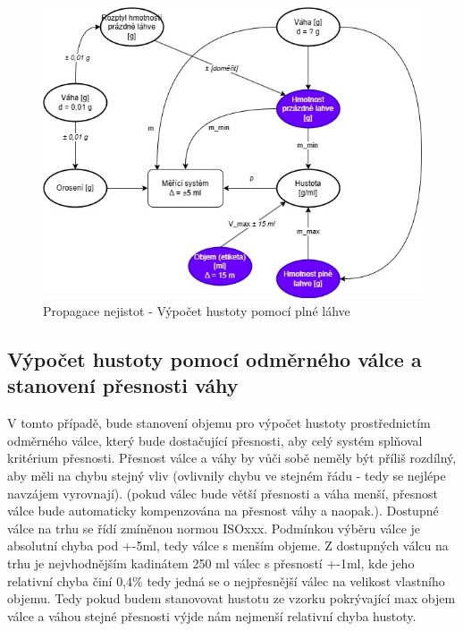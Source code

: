 \begin{figure}[H]
    \begin{center}
        \includegraphics[scale=0.6]{obrazky/Propagace nejistot-Metoda1+.jpg}
    \end{center}
    \caption{Propagace nejistot - Výpočet hustoty pomocí plné láhve}
\end{figure}

\subsection{Výpočet hustoty pomocí odměrného válce a stanovení přesnosti váhy}

V tomto případě, bude stanovení objemu pro výpočet hustoty prostřednictím odměrného válce, který bude dostačující přesnosti, aby celý systém splňoval kritérium přesnosti. Přesnost válce a váhy by vůči sobě neměly být příliš rozdílný, aby měli na chybu stejný vliv (ovlivnily chybu ve stejném řádu - tedy se nejlépe navzájem vyrovnají). (pokud válec bude větší přesnosti a váha menší, přesnost válce bude automaticky kompenzována na přesnost váhy a naopak.). Dostupné válce na trhu se řídí zmíněnou normou ISOxxx. Podmínkou výběru válce je absolutní chyba pod +-5ml, tedy válce s menším objeme. Z dostupných válcu na trhu je nejvhodnějším kadinátem 250 ml válec s přesností +-1ml, kde jeho relativní chyba činí 0,4\% tedy jedná se o nejpřesnější válec na velikost vlastního objemu. Tedy pokud budem stanovovat hustotu ze vzorku pokrývající max objem válce a váhou stejné přesnosti výjde nám nejmenší relativní chyba hustoty.


